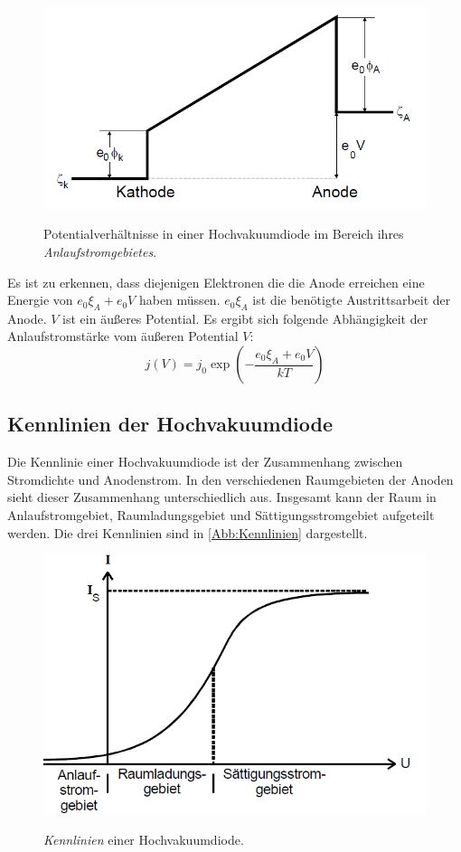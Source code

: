 \begin{figure}[H]
    \centering
    \caption{Potentialverhältnisse in einer Hochvakuumdiode im Bereich ihres \textit{Anlaufstromgebietes}.\cite{sample}}
    \includegraphics[width=\textwidth]{Bilder/Anlauf.png}
    \label{Abb:Anlauf}
\end{figure}

Es ist zu erkennen, dass diejenigen Elektronen die die Anode erreichen eine Energie 
von $e_0 \xi_A + e_0 V$ haben müssen. $e_0 \xi_A$ ist die benötigte Austrittsarbeit der
Anode. $V$ ist ein äußeres Potential. Es ergibt sich folgende Abhängigkeit der Anlaufstromstärke
vom äußeren Potential $V$:
\begin{equation}
    \label{eqn:AnlaufStrom}
    j (V) = j_0 \exp{\left(-\frac{e_0 \xi_A + e_0 V}{kT}\right)}
\end{equation}

\subsection{Kennlinien der Hochvakuumdiode}

Die Kennlinie einer Hochvakuumdiode ist der Zusammenhang zwischen Stromdichte und
Anodenstrom. In den verschiedenen Raumgebieten der Anoden sieht dieser Zusammenhang 
unterschiedlich aus. Insgesamt kann der Raum in Anlaufstromgebiet, Raumladungsgebiet
und Sättigungsstromgebiet aufgeteilt werden. Die drei Kennlinien sind in 
\autoref{Abb:Kennlinien} dargestellt.
\begin{figure}[H]
    \centering
    \caption{\textit{Kennlinien} einer Hochvakuumdiode.\cite{sample}}
    \includegraphics[width=\textwidth]{Bilder/Kennlinien.png}
    \label{Abb:Kennlinien}
\end{figure}

